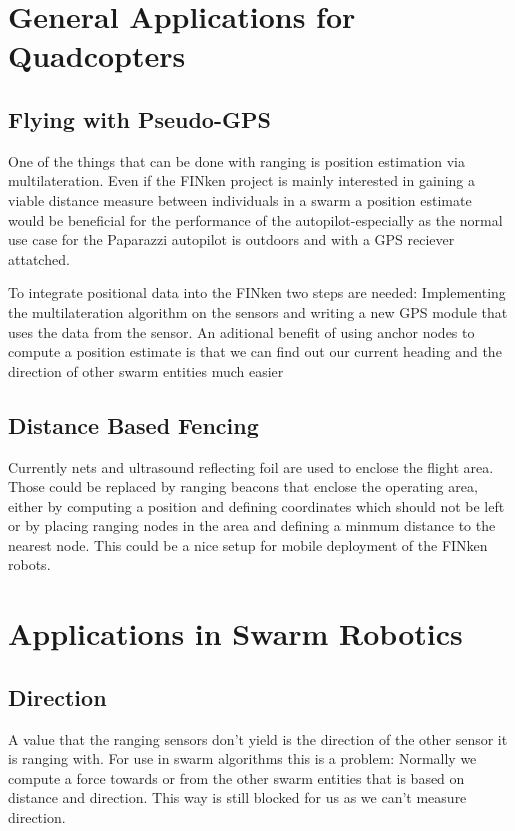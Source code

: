 


\section{General Applications for Quadcopters}
\subsection{Flying with Pseudo-GPS}
One of the things that can be done with ranging is position estimation via multilateration.
Even if the FINken project is mainly interested in gaining a viable distance measure between individuals in a swarm a position estimate would be beneficial for the performance of the autopilot-especially as the normal use case for the Paparazzi autopilot is outdoors and with a GPS reciever attatched.

To integrate positional data into the FINken two steps are needed: Implementing the multilateration algorithm on the sensors and writing a new GPS module that uses the data from the sensor.
An aditional benefit of using anchor nodes to compute a position estimate is that we can find out our current heading and the direction of other swarm entities much easier

\subsection{Distance Based Fencing}
\label{boundingbox}
Currently nets and ultrasound reflecting foil are used to enclose the flight area.
Those could be replaced by ranging beacons that enclose the operating area, either by computing a position and defining coordinates which should not be left or by placing ranging nodes in the area and defining a minmum distance to the nearest node.
This could be a nice setup for mobile deployment of the FINken robots.


\section{Applications in Swarm Robotics}

\subsection{Direction}
A value that the ranging sensors don't yield is the direction of the other sensor it is ranging with.
For use in swarm algorithms this is a problem: Normally we compute a force towards or from the other swarm entities that is based on distance and direction.
This way is still blocked for us as we can't measure direction.

